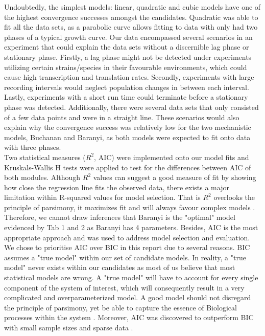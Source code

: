 \documentclass[11pt, a4paper]{article} %
\begin{document}
\noindent Undoubtedly, the simplest models: linear, quadratic and cubic models have one of the highest convergence successes amongst the candidates. Quadratic was able to fit all the data sets, as a parabolic curve allows fitting to data with only had two phases of a typical growth curve. Our data encompassed several scenarios in an experiment that could explain the data sets without a discernible lag phase or stationary phase. Firstly, a lag phase might not be detected under experiments utilizing certain strains/species in their favourable environments, which could cause high transcription and translation rates. Secondly, experiments with large recording intervals would neglect population changes in between each interval. Lastly, experiments with a short run time could terminate before a stationary phase was detected. Additionally, there were several data sets that only consisted of a few data points and were in a straight line. These scenarios would also explain why the convergence success was relatively low for the two mechanistic models, Buchanan and Baranyi, as both models were expected to fit onto data with three phases.\\

\noindent Two statistical measures ($R^2$, AIC) were implemented onto our model fits and Kruskals-Wallis H tests were applied to test for the differences between AIC of both modules. Although $R^2$ values can suggest a good measure of fit by showing how close the regression line fits the observed data, there exists a major limitation within R-squared values for model selection. That is $R^2$ overlooks the principle of parsimony, it maximizes fit and will always favour complex models \cite{johnson2004model}. Therefore, we cannot draw inferences that Baranyi is the "optimal" model evidenced by Tab 1 and 2 as Baranyi has 4 parameters. Besides, AIC is the most appropriate approach and was used to address model selection and evaluation. We chose to prioritise AIC over BIC in this report due to several reasons. BIC assumes a "true model" within our set of candidate models. In reality, a "true model" never exists within our candidates as most of us believe that most statistical models are wrong. A "true model" will have to account for every single component of the system of interest, which will consequently result in a very complicated and overparameterized model. A good model should not disregard the principle of parsimony, yet be able to capture the essence of Biological processes within the system \cite{burnham2004multimodel, chatfield1995model}. Moreover, AIC was discovered to outperform BIC with small sample sizes and sparse data \cite{kuha2004aic}.\\
\end{document}
